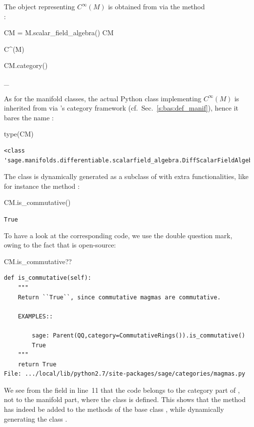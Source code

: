 The \Sage{} object representing $C^\infty(M)$ is obtained from  via the
method\\ :
\begin{NBin}
CM = M.scalar_field_algebra()
CM
\end{NBin}
\begin{NBoutM}
C^{\infty}\left(M\right)
\end{NBoutM}
\begin{NBin}
CM.category()
\end{NBin}
\begin{NBoutM}
_{}
\end{NBoutM}
As for the manifold classes, the actual Python class implementing
$C^\infty(M)$ is inherited from  via \Sage{}'s
category framework (cf.\ Sec.~\ref{s:bas:def_manif}), hence it bares the name :
\begin{NBin}
type(CM)
\end{NBin}
\begin{NBout}
\begin{verbatim}
<class
'sage.manifolds.differentiable.scalarfield_algebra.DiffScalarFieldAlgebra_with_category'>
\end{verbatim}
\end{NBout}
The class  is dynamically generated
as a subclass of  with extra functionalities, like
for instance the method :
\begin{NBin}
CM.is_commutative()
\end{NBin}
\begin{NBout}
\texttt{True}
\end{NBout}
To have a look at the corresponding code,
we use the double question mark, owing to the fact that \Sage{} is open-source:
\begin{NBin}
CM.is_commutative??
\end{NBin}
\begin{lstlisting}
def is_commutative(self):
    """
    Return ``True``, since commutative magmas are commutative.

    EXAMPLES::

        sage: Parent(QQ,category=CommutativeRings()).is_commutative()
        True
    """
    return True
File: .../local/lib/python2.7/site-packages/sage/categories/magmas.py
\end{lstlisting}
We see from the  field in line~11 that the code belongs to the category part of \Sage{}, not to the
manifold part, where the class  is defined.
This shows that the method  has indeed be
added to the methods of the base class , while
dynamically generating the class  .

